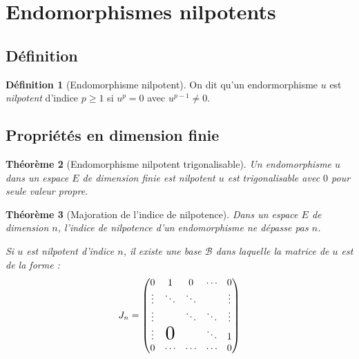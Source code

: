 \documentclass[11pt,a4paper]{report}
\newtheorem{theorem}{Théorème}[chapter]
\theoremstyle{definition}
\newtheorem{dfn}[theorem]{Définition}
\begin{document}
\section{Endomorphismes nilpotents} %
\label{sec:endomorphismes_nilpotents}
\subsection{Définition}
\begin{dfn}[Endomorphisme nilpotent]
     On dit qu'un endormorphisme $u$ est \emph{nilpotent} d'indice $p\ge 1$ si $u^p = 0$ avec $u^{p-1} \neq 0$.
\end{dfn}
\subsection{Propriétés en dimension finie} %
\label{sub:proprietes_en_dimension_finie}
\begin{theorem}[Endomorphisme nilpotent trigonalisable]
     Un endomorphisme $u$ dans un espace $E$ de dimension finie est nilpotent \Longleftrightarrow $u$ est trigonalisable avec $0$ pour seule valeur propre.
\end{theorem}

\begin{theorem}[Majoration de l'indice de nilpotence]
     Dans un espace $E$ de dimension $n$, l'indice de nilpotence d'un endomorphisme ne dépasse pas $n$. \par
     Si $u$ est nilpotent d'indice $n$, il existe une base $\mathcal{B}$ dans laquelle la matrice de $u$ est de la forme :
     \begin{equation}
     J_n=
     \begin{pmatrix}
             0   &         1       &    0   & \cdots &    0   \\
          \vdots &      \ddots     & \ddots &        & \vdots \\
          \vdots &                 & \ddots & \ddots & \vdots \\
          \vdots & \scalebox{2}{0} &        & \ddots &    1   \\
             0   &      \cdots     & \cdots & \cdots &    0  
     \end{pmatrix}
     \end{equation}
\end{theorem}
\end{document}
